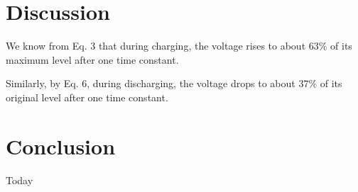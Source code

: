 \documentclass[11pt, titlepage, letterpaper, twoside]{article}
\begin{document}
\pagebreak

\section{Discussion}

We know from Eq. 3 that during charging, the voltage rises to about 63\% of its maximum level after one time constant.


Similarly, by Eq. 6, during discharging, the voltage drops to about 37\% of its original level after one time constant.



\section{Conclusion}
Today
\end{document}

